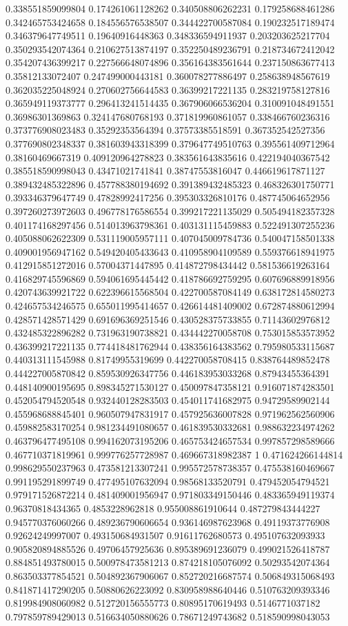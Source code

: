 \begin{table}
\begin{tabu}
\begin{sparkline}{10}
0.338551859099804 0.174261061128262 0.340508806262231 0.179258688461286 0.342465753424658 0.184556576538507 0.344422700587084 0.190232517189474 0.346379647749511 0.19640916448363 0.348336594911937 0.203203625217704 0.350293542074364 0.210627513874197 0.352250489236791 0.218734672412042 0.354207436399217 0.227566648074896 0.356164383561644 0.237150863677413 0.35812133072407 0.247499000443181 0.360078277886497 0.258638948567619 0.362035225048924 0.270602756644583 0.36399217221135 0.283219758127816 0.365949119373777 0.296413241514435 0.367906066536204 0.310091048491551 0.36986301369863 0.324147680768193 0.371819960861057 0.338466760236316 0.373776908023483 0.35292353564394 0.37573385518591 0.367352542527356 0.377690802348337 0.381603943318399 0.379647749510763 0.395561409712964 0.38160469667319 0.409120964278823 0.383561643835616 0.422194040367542 0.385518590998043 0.43471021741841 0.38747553816047 0.446619617871127 0.389432485322896 0.457788380194692 0.391389432485323 0.468326301750771 0.393346379647749 0.47828992417256 0.395303326810176 0.487745064652956 0.397260273972603 0.496778176586554 0.399217221135029 0.505494182357328 0.401174168297456 0.514013963798361 0.403131115459883 0.522491307255236 0.405088062622309 0.531119005957111 0.407045009784736 0.540047158501338 0.409001956947162 0.549420405433643 0.410958904109589 0.559376618941975 0.412915851272016 0.57004371447895 0.414872798434442 0.581536619263164 0.416829745596869 0.594061695445442 0.418786692759295 0.607696889918956 0.420743639921722 0.622396615568504 0.422700587084149 0.638172814580273 0.424657534246575 0.655011995414657 0.426614481409002 0.672874880612994 0.428571428571429 0.691696369251546 0.430528375733855 0.71143602976812 0.432485322896282 0.731963190738821 0.434442270058708 0.753015853573952 0.436399217221135 0.774418481762944 0.438356164383562 0.795980533115687 0.440313111545988 0.81749955319699 0.442270058708415 0.838764489852478 0.444227005870842 0.859530926347756 0.446183953033268 0.87943455364391 0.448140900195695 0.898345271530127 0.450097847358121 0.916071874283501 0.452054794520548 0.932440128283503 0.454011741682975 0.94729589902144 0.455968688845401 0.960507947831917 0.457925636007828 0.971962562560906 0.459882583170254 0.981234491080657 0.461839530332681 0.988632234974262 0.463796477495108 0.994162073195206 0.465753424657534 0.997857298589666 0.467710371819961 0.999776257728987 0.469667318982387 1 0.471624266144814 0.998629550237963 0.473581213307241 0.995572578738357 0.475538160469667 0.991195291899749 0.477495107632094 0.98568133520791 0.479452054794521 0.979171526872214 0.481409001956947 0.971803349150446 0.483365949119374 0.96370818434365 0.4853228962818 0.955008861910644 0.487279843444227 0.945770376060266 0.489236790606654 0.936146987623968 0.49119373776908 0.92624249997007 0.493150684931507 0.91611762680573 0.495107632093933 0.905820894885526 0.49706457925636 0.895389691236079 0.499021526418787 0.884851493780015 0.500978473581213 0.874218105076092 0.50293542074364 0.863503377854521 0.504892367906067 0.852720216687574 0.506849315068493 0.841871417290205 0.50880626223092 0.830958988640446 0.510763209393346 0.819984908060982 0.512720156555773 0.80895170619493 0.5146771037182 0.797859789429013 0.516634050880626 0.78671249743682 0.518590998043053 
\end{sparkline}
\end{tabu}
\end{table}

